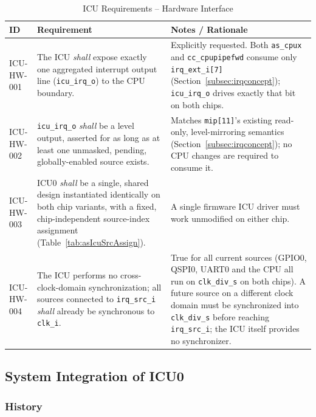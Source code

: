 \begin{table}[H]
\caption{ICU Requirements -- Hardware Interface}
\label{tab:asIcuReqHW}
\centering
\begin{tabularx}{\textwidth}{|l |X |X|}
  \hline
  ID & Requirement & Notes / Rationale \\
  \hline
  \hline
  ICU-HW-001 &
    The ICU \textit{shall} expose exactly one aggregated interrupt output
    line (\texttt{icu\_irq\_o}) to the CPU boundary. &
    Explicitly requested. Both \texttt{as\_cpux} and \texttt{cc\_cpupipefwd}
    consume only \texttt{irq\_ext\_i[7]}
    (Section~\ref{subsec:irqconcept}); \texttt{icu\_irq\_o} drives exactly
    that bit on both chips. \\
  \hline
  ICU-HW-002 &
    \texttt{icu\_irq\_o} \textit{shall} be a level output, asserted for as
    long as at least one unmasked, pending, globally-enabled source
    exists. &
    Matches \texttt{mip[11]}'s existing read-only, level-mirroring
    semantics (Section~\ref{subsec:irqconcept}); no CPU changes are
    required to consume it. \\
  \hline
  ICU-HW-003 &
    ICU0 \textit{shall} be a single, shared design instantiated
    identically on both chip variants, with a fixed, chip-independent
    source-index assignment (Table~\ref{tab:asIcuSrcAssign}). &
    A single firmware ICU driver must work unmodified on either chip. \\
  \hline
  ICU-HW-004 &
    The ICU performs no cross-clock-domain synchronization; all sources
    connected to \texttt{irq\_src\_i} \textit{shall} already be synchronous
    to \texttt{clk\_i}. &
    True for all current sources (GPIO0, QSPI0, UART0 and the CPU all run
    on \texttt{clk\_div\_s} on both chips). A future source on a different
    clock domain must be synchronized into \texttt{clk\_div\_s} before
    reaching \texttt{irq\_src\_i}; the ICU itself provides no
    synchronizer. \\
  \hline
\end{tabularx}
\end{table}

\subsection{System Integration of ICU0}

\subsubsection{History}

